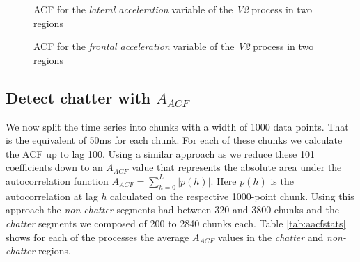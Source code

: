 \documentclass[12 pt]{scrartcl}
\begin{document}
\begin{figure}[p]
  \caption{ACF for the \emph{lateral acceleration} variable of the \emph{V2} process in two regions}
  \label{fig:v2-lateral-acfs}
\end{figure}


\begin{figure}[p]
  \caption{ACF for the \emph{frontal acceleration} variable of the \emph{V2} process in two regions}
  \label{fig:v2-frontal-acfs}
\end{figure}

\subsection{Detect chatter with $A_{ACF}$}

We now split the time series into chunks with a width of 1000 data points. That is the equivalent of 50ms for each chunk. For each of these chunks we calculate the ACF up to lag 100.
Using a similar approach as \citet{deistler2022time} we reduce these 101 coefficients down to an $A_{ACF}$ value that represents the absolute area under the autocorrelation function $A_{ACF} = \sum^{L}_{h=0}{|p(h)|}$.
Here $p(h)$ is the autocorrelation at lag $h$ calculated on the respective 1000-point chunk. Using this approach the \emph{non-chatter} segments had between 320 and 3800 chunks and the \emph{chatter} segments we composed of 200 to 2840 chunks each. Table \ref{tab:aacfstats} shows for each of the processes the average $A_{ACF}$ values in the \emph{chatter} and \emph{non-chatter} regions.
\end{document}
